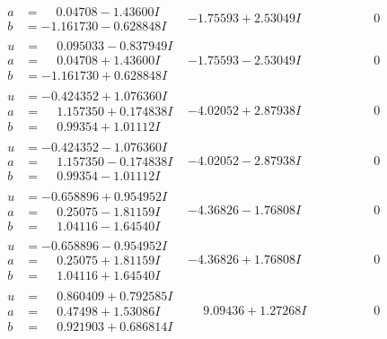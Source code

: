 \documentclass[1p]{elsarticle_modified}
\theoremstyle{definition}
\begin{document}
$$\begin{array}{c|c|c}
\begin{aligned}
a &= \phantom{-}0.04708 - 1.43600 I \\
b &= -1.161730 - 0.628848 I\end{aligned}
 & -1.75593 + 2.53049 I & \phantom{-0.000000 } 0 \\ \hline\begin{aligned}
u &= \phantom{-}0.095033 - 0.837949 I \\
a &= \phantom{-}0.04708 + 1.43600 I \\
b &= -1.161730 + 0.628848 I\end{aligned}
 & -1.75593 - 2.53049 I & \phantom{-0.000000 } 0 \\ \hline\begin{aligned}
u &= -0.424352 + 1.076360 I \\
a &= \phantom{-}1.157350 + 0.174838 I \\
b &= \phantom{-}0.99354 + 1.01112 I\end{aligned}
 & -4.02052 + 2.87938 I & \phantom{-0.000000 } 0 \\ \hline\begin{aligned}
u &= -0.424352 - 1.076360 I \\
a &= \phantom{-}1.157350 - 0.174838 I \\
b &= \phantom{-}0.99354 - 1.01112 I\end{aligned}
 & -4.02052 - 2.87938 I & \phantom{-0.000000 } 0 \\ \hline\begin{aligned}
u &= -0.658896 + 0.954952 I \\
a &= \phantom{-}0.25075 - 1.81159 I \\
b &= \phantom{-}1.04116 - 1.64540 I\end{aligned}
 & -4.36826 - 1.76808 I & \phantom{-0.000000 } 0 \\ \hline\begin{aligned}
u &= -0.658896 - 0.954952 I \\
a &= \phantom{-}0.25075 + 1.81159 I \\
b &= \phantom{-}1.04116 + 1.64540 I\end{aligned}
 & -4.36826 + 1.76808 I & \phantom{-0.000000 } 0 \\ \hline\begin{aligned}
u &= \phantom{-}0.860409 + 0.792585 I \\
a &= \phantom{-}0.47498 + 1.53086 I \\
b &= \phantom{-}0.921903 + 0.686814 I\end{aligned}
 & \phantom{-}9.09436 + 1.27268 I & \phantom{-0.000000 } 0 \\ \hline\begin{aligned}

\end{aligned}
\end{array}$$
\end{document}
